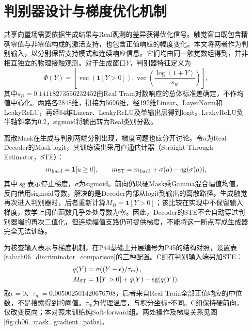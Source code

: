 \section{判别器设计与梯度优化机制}
\label{sec:ch06_discriminator_gradient}

共享向量场需要依据生成结果与Real观测的差异获得优化信号。触觉窗口既包含精确零值与非零值构成的激活支持，也包含正值响应的幅度变化。本文将两者作为判别输入，以分别保留支持模式和连续响应信息。它们均由同一触觉数组得到，并非相互独立的物理接触观测。对于生成窗口$Y$，判别器特征定义为
\begin{equation}
 \Phi(Y)=\left[\operatorname{vec}\!\left(\mathbf1[Y>0]\right),
 \operatorname{vec}\!\left(\frac{\log(1+Y)}{s_R}\right)\right],
 \label{eq:ch06_discriminator_features}
\end{equation}
其中$s_R=0.14118273556232452$由Real Train对数响应的总体标准差确定，不作均值中心化。两路各2848维，拼接为5696维，经192维Linear、LayerNorm和LeakyReLU，再经64维Linear、LeakyReLU及单输出层得到logit。LeakyReLU负半轴斜率为0.2，sigmoid将输出转为Real类别分数。

离散Mask在生成与判别两端分别出现，梯度问题也应分开讨论。令$a$为Real Decoder的Mask logit，其训练读出采用直通估计器（Straight-Through Estimator，STE）：
\begin{equation}
 m_{\rm hard}=\mathbf1[a\ge0],\qquad
 m_{\rm ST}=m_{\rm hard}+\sigma(a)-\operatorname{sg}(\sigma(a)),
 \label{eq:ch06_decoder_ste}
\end{equation}
其中$\operatorname{sg}$表示停止梯度，$\sigma$为sigmoid。前向仍以硬Mask乘Gamma混合幅值均值，反向借用sigmoid导数，解决的是Decoder内部从logit到输出的离散路径。生成触觉再次进入判别器时，后者重新计算$M_D=\mathbf1[Y>0]$；该比较在实现中不保留输入梯度，数学上阈值函数几乎处处导数为零。因此，Decoder的STE不会自动穿过判别器端的再次二值化，但连续幅值支路仍可提供梯度，不能将这一断点写成生成器完全无法训练。

为核查输入表示与梯度机制，在P44基础上开展编号为P45的结构对照，设置表\ref{tab:ch06_discriminator_comparison}的三种配置。C组在判别输入端另加STE：
\begin{equation}
 \begin{aligned}
 q(Y)&=\sigma\!\left((Y-\epsilon)/\tau_m\right),\\
 M_{\rm ST}&=\mathbf1[Y>0]+q(Y)-\operatorname{sg}(q(Y)).
 \end{aligned}
 \label{eq:ch06_discriminator_ste}
\end{equation}
取$\epsilon=0$、$\tau_m=0.005002501420676708$，后者来自Real Train全部正值响应的中位数，不是搜索得到的阈值。$\tau_m$为代理温度，与积分坐标$\tau$不同。C组保持硬前向，仅改变反向；本对照未训练纯Soft-forward组。两处操作及梯度关系见图\ref{fig:ch06_mask_gradient_paths}。


